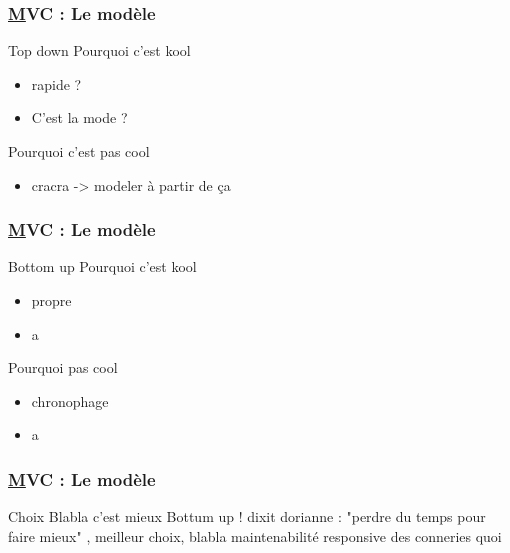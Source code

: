 \speaker{\Julie}
\begin{frame}
	\frametitle{\underline{M}VC : Le modèle}
	\begin{block}{Top down}
		Pourquoi c'est kool
		\begin{itemize}
			\item rapide ?
			\item C'est la mode ?
		\end{itemize}
 
		Pourquoi c'est pas cool
		\begin{itemize}
			\item cracra -> modeler à partir de ça
		\end{itemize}
	\end{block}
\end{frame}


\begin{frame}
	\frametitle{\underline{M}VC : Le modèle}
	\begin{block}{Bottom up}
	Pourquoi c'est kool
		\begin{itemize}
			\item propre
			\item a
		\end{itemize} 
		Pourquoi pas cool
		\begin{itemize}
			\item chronophage
			\item a
		\end{itemize}
	\end{block}
  
\end{frame}

\begin{frame}
	\frametitle{\underline{M}VC : Le modèle}
	\begin{block}{Choix}
		Blabla c'est mieux Bottum up !
		dixit dorianne : "perdre du temps pour faire mieux" , meilleur choix, blabla maintenabilité responsive des conneries quoi
	\end{block}
\end{frame}